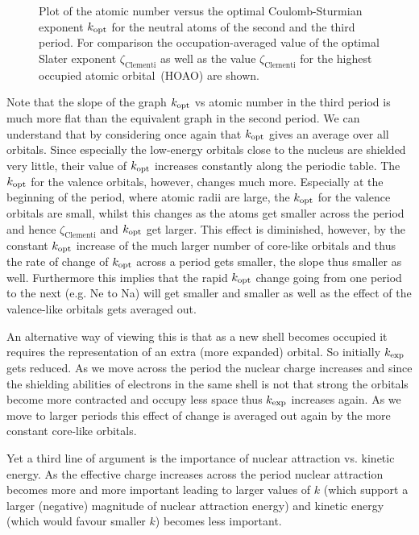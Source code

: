 \begin{figure}
	\centering
	\caption{Plot of the atomic number versus the optimal Coulomb-Sturmian exponent
		$k_\text{opt}$ for the neutral atoms of the second and the third period.
		For comparison the occupation-averaged value of the \citet{Clementi1963} optimal
		Slater exponent $\zeta_\text{Clementi}$ as well as the
		value $\zeta_\text{Clementi}$ for the highest occupied atomic orbital~(HOAO)
		are shown.
	}
	\label{fig:KoptVsAtnum}
\end{figure}

Note that the slope of the graph $k_\text{opt}$ vs atomic number in the third period
is much more flat than the equivalent graph in the second period.
We can understand that by considering once again
that $k_\text{opt}$ gives an average over all orbitals.
Since especially the low-energy orbitals close to the nucleus
are shielded very little,
their value of $k_\text{opt}$ increases constantly along the periodic table.
The $k_\text{opt}$ for the valence orbitals, however, changes much more.
Especially at the beginning of the period, where atomic radii are large,
the $k_\text{opt}$ for the valence orbitals are small,
whilst this changes as the atoms get smaller across the period
and hence $\zeta_\text{Clementi}$ and $k_\text{opt}$ get larger.
This effect is diminished, however,
by the constant $k_\text{opt}$ increase of the
much larger number of core-like orbitals
and thus the rate of change of $k_\text{opt}$ across a period gets smaller,
the slope thus smaller as well.
Furthermore this implies that the rapid $k_\text{opt}$ change
going from one period to the next (e.g. Ne to Na)
will get smaller and smaller as well
as the effect of the valence-like orbitals gets averaged out.

An alternative way of viewing this is
that as a new shell becomes occupied it requires
the representation of an extra (more expanded) orbital.
So initially $k_\text{exp}$ gets reduced.
As we move across the period the nuclear charge increases
and since the shielding abilities of electrons in the same shell
is not that strong the orbitals become more contracted and occupy less space
thus $k_\text{exp}$ increases again.
As we move to larger periods this effect of change is averaged out
again by the more constant core-like orbitals.

Yet a third line of argument is the importance of nuclear attraction
vs. kinetic energy.
As the effective charge increases across the period
nuclear attraction becomes more and more important leading to larger values of $k$
(which support a larger (negative) magnitude of nuclear attraction energy)
and kinetic energy (which would favour smaller $k$) becomes less important.

